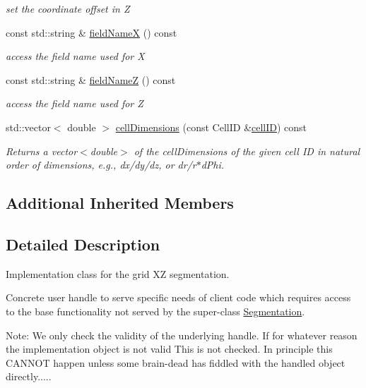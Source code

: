 \begin{DoxyCompactItemize}
\begin{DoxyCompactList}\small\item\em set the coordinate offset in Z \end{DoxyCompactList}\item 
const std\+::string \& \hyperlink{class_d_d4hep_1_1_geometry_1_1_cartesian_grid_x_z_a998e829705c38ce261ec90925d9bf15c}{field\+NameX} () const
\begin{DoxyCompactList}\small\item\em access the field name used for X \end{DoxyCompactList}\item 
const std\+::string \& \hyperlink{class_d_d4hep_1_1_geometry_1_1_cartesian_grid_x_z_ac70fd7f9219dc5c3f0c6a4aab61485e4}{field\+NameZ} () const
\begin{DoxyCompactList}\small\item\em access the field name used for Z \end{DoxyCompactList}\item 
std\+::vector$<$ double $>$ \hyperlink{class_d_d4hep_1_1_geometry_1_1_cartesian_grid_x_z_af472a94aeb4071cb21f1b1709632bd7f}{cell\+Dimensions} (const Cell\+ID \&\hyperlink{class_d_d4hep_1_1_geometry_1_1_cartesian_grid_x_z_a6b70239098d046763a1ada29146ab1be}{cell\+ID}) const
\begin{DoxyCompactList}\small\item\em Returns a vector$<$double$>$ of the cell\+Dimensions of the given cell ID in natural order of dimensions, e.\+g., dx/dy/dz, or dr/r$\ast$d\+Phi. \end{DoxyCompactList}\end{DoxyCompactItemize}
\subsection*{Additional Inherited Members}


\subsection{Detailed Description}
Implementation class for the grid XZ segmentation. 

Concrete user handle to serve specific needs of client code which requires access to the base functionality not served by the super-\/class \hyperlink{class_d_d4hep_1_1_geometry_1_1_segmentation}{Segmentation}.

Note\+: We only check the validity of the underlying handle. If for whatever reason the implementation object is not valid This is not checked. In principle this C\+A\+N\+N\+OT happen unless some brain-\/dead has fiddled with the handled object directly.....

